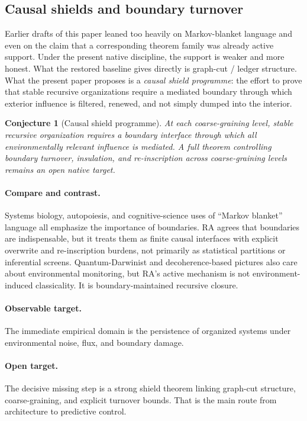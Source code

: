 \documentclass[11pt]{article}
\newtheorem{conjecture}{Conjecture}
\begin{document}
\subsection{Causal shields and boundary turnover}
\label{sec:shields}

Earlier drafts of this paper leaned too heavily on Markov-blanket language and even on the claim that a corresponding theorem family was already active support. Under the present native discipline, the support is weaker and more honest. What the restored baseline gives directly is graph-cut / ledger structure. What the present paper proposes is a \emph{causal shield programme}: the effort to prove that stable recursive organizations require a mediated boundary through which exterior influence is filtered, renewed, and not simply dumped into the interior.

\begin{conjecture}[Causal shield programme]
At each coarse-graining level, stable recursive organization requires a boundary interface through which all environmentally relevant influence is mediated. A full theorem controlling boundary turnover, insulation, and re-inscription across coarse-graining levels remains an open native target.
\end{conjecture}

\paragraph{Compare and contrast.} Systems biology, autopoiesis, and cognitive-science uses of ``Markov blanket'' language all emphasize the importance of boundaries. RA agrees that boundaries are indispensable, but it treats them as finite causal interfaces with explicit overwrite and re-inscription burdens, not primarily as statistical partitions or inferential screens. Quantum-Darwinist and decoherence-based pictures also care about environmental monitoring, but RA's active mechanism is not environment-induced classicality. It is boundary-maintained recursive closure.

\paragraph{Observable target.} The immediate empirical domain is the persistence of organized systems under environmental noise, flux, and boundary damage.

\paragraph{Open target.} The decisive missing step is a strong shield theorem linking graph-cut structure, coarse-graining, and explicit turnover bounds. That is the main route from architecture to predictive control.
\end{document}
